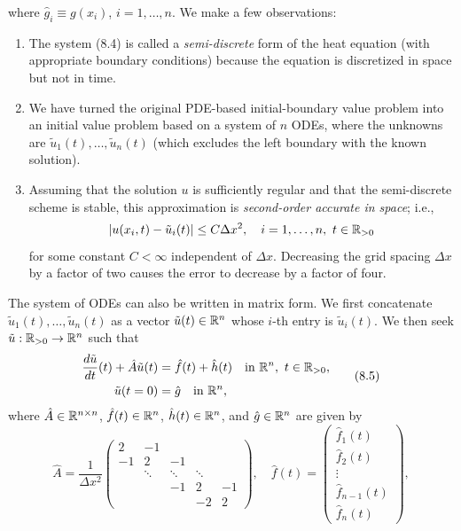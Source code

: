 where $\hat{g}_i \equiv g(x_i)$, $i = 1, \dots, n$. We make a few observations:
\begin{enumerate}
    \item The system (8.4) is called a \textit{semi-discrete} form of the heat equation (with appropriate boundary conditions) because the equation is discretized in space but not in time.
    \item We have turned the original PDE-based initial-boundary value problem into an initial value problem based on a system of $n$ ODEs, where the unknowns are $\tilde{u}_1(t), \dots, \tilde{u}_n(t)$ (which excludes the left boundary with the known solution).
    \item Assuming that the solution $u$ is sufficiently regular and that the semi-discrete scheme is stable, this approximation is \textit{second-order accurate in space}; i.e.,
    \[|u(x_i, t) - \tilde{u}_i(t)| \leq C\Delta x^2, \quad i = 1, \dots, n, \ t \in \mathbb{R}_{>0}\]
    for some constant $C < \infty$ independent of $\Delta x$. Decreasing the grid spacing $\Delta x$ by a factor of two causes the error to decrease by a factor of four.
\end{enumerate}
The system of ODEs can also be written in matrix form. We first concatenate $\tilde{u}_1(t), \dots, \tilde{u}_n(t)$ as a vector $\tilde{u}(t) \in \mathbb{R}^n$ whose $i$-th entry is $\tilde{u}_i(t)$. We then seek $\tilde{u} : \mathbb{R}_{>0} \to \mathbb{R}^n$ such that
\begin{equation*}
    \begin{aligned}
        \frac{d\tilde{u}}{dt}(t) + \hat{A}\tilde{u}(t) &= \hat{f}(t) + \hat{h}(t) \quad \text{in } \mathbb{R}^n, \ t \in \mathbb{R}_{>0}, \\
        \tilde{u}(t = 0) &= \hat{g} \quad \text{in } \mathbb{R}^n,
    \end{aligned} \tag{8.5}
\end{equation*}
where $\hat{A} \in \mathbb{R}^{n \times n}$, $\hat{f}(t) \in \mathbb{R}^n$, $\hat{h}(t) \in \mathbb{R}^n$, and $\hat{g} \in \mathbb{R}^n$ are given by
\[\hat{A} = \frac{1}{\Delta x^2} \begin{pmatrix} 2 & -1 & & & \\ -1 & 2 & -1 & & \\ & \ddots & \ddots & \ddots & \\ & & -1 & 2 & -1 \\ & & & -2 & 2 \end{pmatrix}, \quad \hat{f}(t) = \begin{pmatrix} \hat{f}_1(t) \\ \hat{f}_2(t) \\ \vdots \\ \hat{f}_{n-1}(t) \\ \hat{f}_n(t) \end{pmatrix},\]
